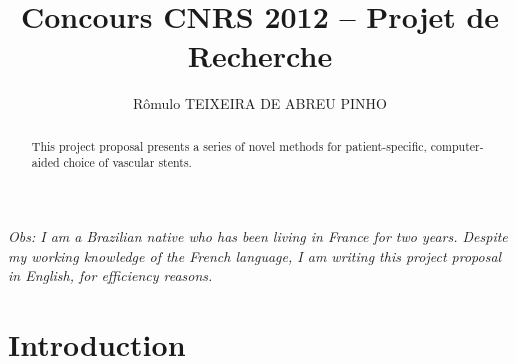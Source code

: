 \documentclass{article}
\title{Concours CNRS 2012 -- Projet de Recherche}
\author{R\^omulo TEIXEIRA DE ABREU PINHO}
\date{}
\begin{document}
\maketitle

\begin{flushleft}
{\em Obs: I am a Brazilian native who has been living in France for two years. Despite my working knowledge of the French language, I am writing this project proposal in English, for efficiency reasons.}
\end{flushleft}

\begin{abstract}
This project proposal presents a series of novel methods for patient-specific, computer-aided choice of vascular stents.
\end{abstract}

\section{Introduction}
\end{document}

